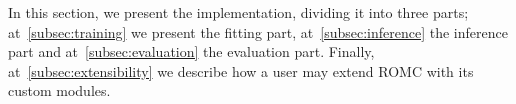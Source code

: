 In this section, we present the implementation, dividing it into three
parts; at~\ref{subsec:training} we present the fitting part,
at~\ref{subsec:inference} the inference part and
at~\ref{subsec:evaluation} the evaluation part. Finally,
at~\ref{subsec:extensibility} we describe how a user may extend ROMC
with its custom modules.
